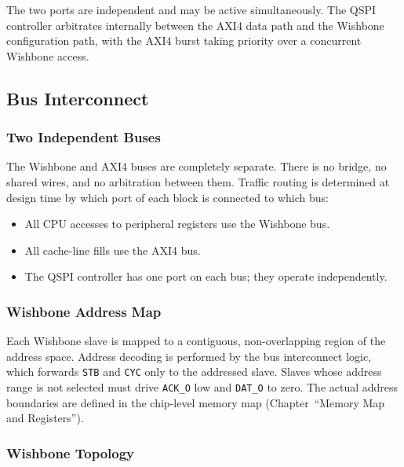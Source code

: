 The two ports are independent and may be active simultaneously.
The QSPI controller arbitrates internally between the AXI4 data path
and the Wishbone configuration path, with the AXI4 burst taking
priority over a concurrent Wishbone access.



\subsection{Bus Interconnect}
\label{subsec:asBusInterconnect}

\subsubsection{Two Independent Buses}

The Wishbone and AXI4 buses are completely separate.
There is no bridge, no shared wires, and no arbitration between them.
Traffic routing is determined at design time by which port of each block
is connected to which bus:

\begin{itemize}
  \item All CPU accesses to peripheral registers use the Wishbone bus.
  \item All cache-line fills use the AXI4 bus.
  \item The QSPI controller has one port on each bus; they operate
    independently.
\end{itemize}

\subsubsection{Wishbone Address Map}

Each Wishbone slave is mapped to a contiguous, non-overlapping region of
the address space.
Address decoding is performed by the bus interconnect logic, which
forwards \texttt{STB} and \texttt{CYC} only to the addressed slave.
Slaves whose address range is not selected must drive \texttt{ACK\_O}
low and \texttt{DAT\_O} to zero.
The actual address boundaries are defined in the chip-level memory map
(Chapter~``Memory Map and Registers'').

\subsubsection{Wishbone Topology}

